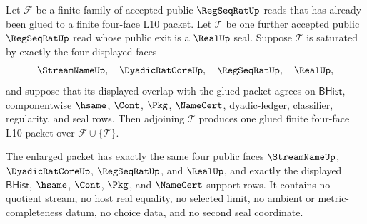 \begin{theorem}
\label{thm:regseqrat-real-seal-finite-cover-induction-step}
Let $\mathcal{F}$ be a finite family of accepted public $\RegSeqRatUp$ reads
that has already been glued to a finite four-face L10 packet. Let
$\mathcal{T}$ be one further accepted public $\RegSeqRatUp$ read whose public
exit is a $\RealUp$ seal. Suppose $\mathcal{T}$ is saturated by exactly the
four displayed faces
$$
\StreamNameUp,\quad \DyadicRatCoreUp,\quad \RegSeqRatUp,\quad \RealUp,
$$
and suppose that its displayed overlap with the glued packet agrees on
$\mathsf{BHist}$, componentwise $\hsame$, $\Cont$, $\Pkg$, $\NameCert$,
dyadic-ledger, classifier, regularity, and seal rows. Then adjoining
$\mathcal{T}$ produces one glued finite four-face L10 packet over
$\mathcal{F}\cup\{\mathcal{T}\}$.

The enlarged packet has exactly the same four public faces
$\StreamNameUp$, $\DyadicRatCoreUp$, $\RegSeqRatUp$, and $\RealUp$, and exactly
the displayed $\mathsf{BHist}$, $\hsame$, $\Cont$, $\Pkg$, and $\NameCert$
support rows. It contains no quotient stream, no host real equality, no
selected limit, no ambient or metric-completeness datum, no choice data, and no
second seal coordinate.
\end{theorem}
